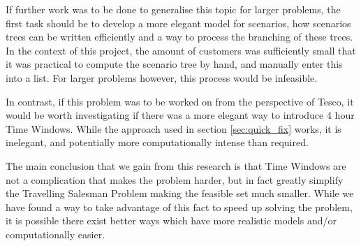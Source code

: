 If further work was to be done to generalise this topic for larger problems, the first task should be to develop a more elegant model for scenarios, how scenarios trees can be written efficiently and a way to process the branching of these trees. In the context of this project, the amount of customers was sufficiently small that it was practical to compute the scenario tree by hand, and manually enter this into a list. For larger problems however, this process would be infeasible.

In contrast, if this problem was to be worked on from the perspective of Tesco, it would be worth investigating if there was a more elegant way to introduce 4 hour Time Windows. While the approach used in section \ref{sec:quick_fix} works, it is inelegant, and potentially more computationally intense than required.

The main conclusion that we gain from this research is that Time Windows are not a complication that makes the problem harder, but in fact greatly simplify the Travelling Salesman Problem making the feasible set much smaller. While we have found a way to take advantage of this fact to speed up solving the problem, it is possible there exist better ways which have more realistic models and/or computationally easier.




